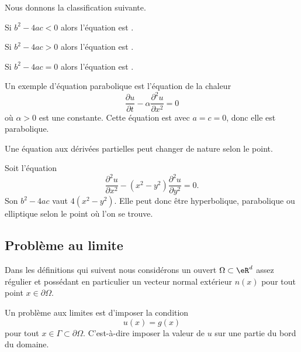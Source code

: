 Nous donnons la classification suivante.

\begin{definition}
	Si \( b^2-4ac<0\) alors l'équation est .

	Si \( b^2-4ac>0\) alors l'équation est .

	Si \( b^2-4ac=0\) alors l'équation est .
\end{definition}

\begin{example}
	Un exemple d'équation parabolique est l'équation de la chaleur
	\begin{equation}
		\frac{ \partial u }{ \partial t }-\alpha\frac{ \partial^2u }{ \partial x^2 }=0
	\end{equation}
	où \( \alpha>0\) est une constante. Cette équation est avec \( a=c=0\), donc elle est parabolique.
\end{example}

Une équation aux dérivées partielles peut changer de nature selon le point.

\begin{example}
	Soit l'équation
	\begin{equation}
		\frac{ \partial^2u }{ \partial x^2 }-(x^2-y^2)\frac{ \partial^2u }{ \partial y^2 }=0.
	\end{equation}
	Son \( b^2-4ac\) vaut \( 4(x^2-y^2)\). Elle peut donc être hyperbolique, parabolique ou elliptique selon le point où l'on se trouve.
\end{example}

\subsection{Problème au limite}

Dans les définitions qui suivent nous considérons un ouvert \( \Omega\subset \eR^d\) assez régulier et possédant en particulier un vecteur normal extérieur \( n(x)\) pour tout point \( x\in\partial\Omega\).

\begin{definition}
	Un problème aux limites  est d'imposer la condition
	\begin{equation}
		u(x)=g(x)
	\end{equation}
	pour tout \( x\in\Gamma\subset \partial\Omega\). C'est-à-dire imposer la valeur de \( u\) sur une partie du bord du domaine.
\end{definition}


